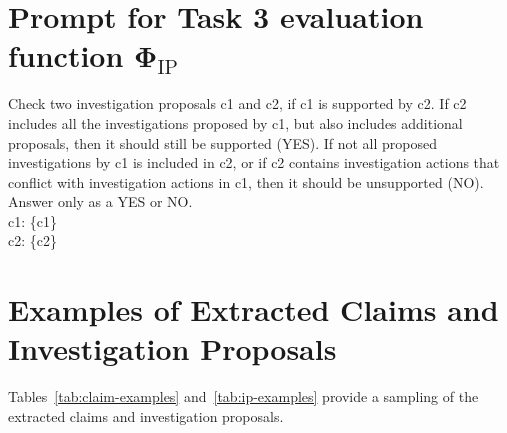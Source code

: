 \documentclass[11pt]{article}
\begin{document}
\section{Prompt for Task 3 evaluation function $\mathbf{\Phi}_{\textrm{IP}}$}
\label{appendix:phi_IP}
\begin{mdframed}[backgroundcolor=blue!20]
\noindent Check two investigation proposals c1 and c2, if c1 is supported by c2. If c2 includes all the investigations proposed by c1, but also includes additional proposals, then it should still be supported (YES). If not all proposed investigations by c1 is included in c2, or if c2 contains investigation actions that conflict with investigation actions in c1, then it should be unsupported (NO). Answer only as a YES or NO.\\
\noindent c1: \{c1\}\\
\noindent c2: \{c2\}
\end{mdframed}

\section{Examples of Extracted Claims and Investigation Proposals}
\label{appendix:claim-IP-examples}
Tables~\ref{tab:claim-examples} and~\ref{tab:ip-examples} provide a sampling of the extracted claims and investigation proposals. 
\end{document}
